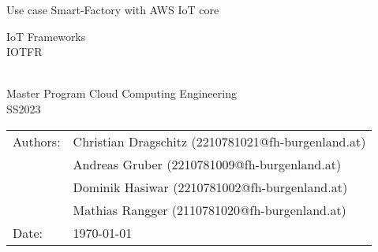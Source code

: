 \begin{titlepage}
	\thispagestyle{scrheadings}
	\ofoot{}
\noindent
\vspace*{1cm}


\begin{center}  %
	\huge{Use case Smart-Factory with AWS IoT core }

    \vspace{3cm}

    \large{
    	IoT Frameworks\\
        IOTFR
          }
         
        \large{	~\newline \newline
        \\Master Program Cloud Computing Engineering \\
        SS2023
        }
  
\end{center}
\vspace{1cm}

  \noindent\begin{tabular}{@{}ll}
Authors:
& Christian Dragschitz (\lowercase{2210781021@fh-burgenland.at})
\\ & Andreas Gruber (\lowercase{2210781009@fh-burgenland.at})
\\ & Dominik Hasiwar (\lowercase{2210781002@fh-burgenland.at})
\\ & Mathias Rangger (\lowercase{2110781020@fh-burgenland.at})
\\ Date: & \today
\end{tabular}

\end{titlepage}
